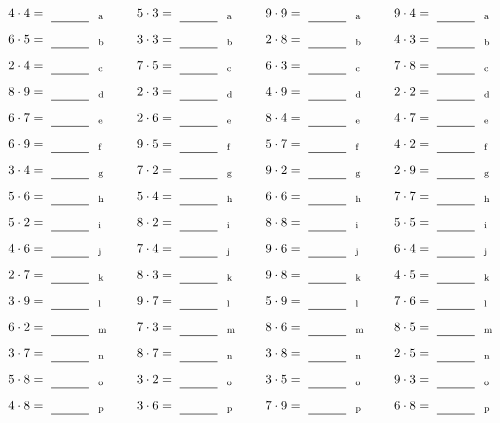 \documentclass
[
  draft    = true,
  fontsize = 11pt,
  parskip  = half-
]
{scrartcl}
\begin{document}
\par\vfill\par
\begin{align*}
    \pline{4\cdot4}&=\rline{a}
  & \pline{5\cdot3}&=\rline{a}
  & \pline{9\cdot9}&=\rline{a}
  & \pline{9\cdot4}&=\rline{a} \\[1ex]
    \pline{6\cdot5}&=\rline{b}
  & \pline{3\cdot3}&=\rline{b}
  & \pline{2\cdot8}&=\rline{b}
  & \pline{4\cdot3}&=\rline{b} \\[1ex]
    \pline{2\cdot4}&=\rline{c}
  & \pline{7\cdot5}&=\rline{c}
  & \pline{6\cdot3}&=\rline{c}
  & \pline{7\cdot8}&=\rline{c} \\[1ex]
    \pline{8\cdot9}&=\rline{d}
  & \pline{2\cdot3}&=\rline{d}
  & \pline{4\cdot9}&=\rline{d}
  & \pline{2\cdot2}&=\rline{d} \\[1ex]
    \pline{6\cdot7}&=\rline{e}
  & \pline{2\cdot6}&=\rline{e}
  & \pline{8\cdot4}&=\rline{e}
  & \pline{4\cdot7}&=\rline{e} \\[1ex]
    \pline{6\cdot9}&=\rline{f}
  & \pline{9\cdot5}&=\rline{f}
  & \pline{5\cdot7}&=\rline{f}
  & \pline{4\cdot2}&=\rline{f} \\[1ex]
    \pline{3\cdot4}&=\rline{g}
  & \pline{7\cdot2}&=\rline{g}
  & \pline{9\cdot2}&=\rline{g}
  & \pline{2\cdot9}&=\rline{g} \\[1ex]
    \pline{5\cdot6}&=\rline{h}
  & \pline{5\cdot4}&=\rline{h}
  & \pline{6\cdot6}&=\rline{h}
  & \pline{7\cdot7}&=\rline{h} \\[1ex]
    \pline{5\cdot2}&=\rline{i}
  & \pline{8\cdot2}&=\rline{i}
  & \pline{8\cdot8}&=\rline{i}
  & \pline{5\cdot5}&=\rline{i} \\[1ex]
    \pline{4\cdot6}&=\rline{j}
  & \pline{7\cdot4}&=\rline{j}
  & \pline{9\cdot6}&=\rline{j}
  & \pline{6\cdot4}&=\rline{j} \\[1ex]
    \pline{2\cdot7}&=\rline{k}
  & \pline{8\cdot3}&=\rline{k}
  & \pline{9\cdot8}&=\rline{k}
  & \pline{4\cdot5}&=\rline{k} \\[1ex]
    \pline{3\cdot9}&=\rline{l}
  & \pline{9\cdot7}&=\rline{l}
  & \pline{5\cdot9}&=\rline{l}
  & \pline{7\cdot6}&=\rline{l} \\[1ex]
    \pline{6\cdot2}&=\rline{m}
  & \pline{7\cdot3}&=\rline{m}
  & \pline{8\cdot6}&=\rline{m}
  & \pline{8\cdot5}&=\rline{m} \\[1ex]
    \pline{3\cdot7}&=\rline{n}
  & \pline{8\cdot7}&=\rline{n}
  & \pline{3\cdot8}&=\rline{n}
  & \pline{2\cdot5}&=\rline{n} \\[1ex]
    \pline{5\cdot8}&=\rline{o}
  & \pline{3\cdot2}&=\rline{o}
  & \pline{3\cdot5}&=\rline{o}
  & \pline{9\cdot3}&=\rline{o} \\[1ex]
    \pline{4\cdot8}&=\rline{p}
  & \pline{3\cdot6}&=\rline{p}
  & \pline{7\cdot9}&=\rline{p}
  & \pline{6\cdot8}&=\rline{p}
\end{align*}
\end{document}
